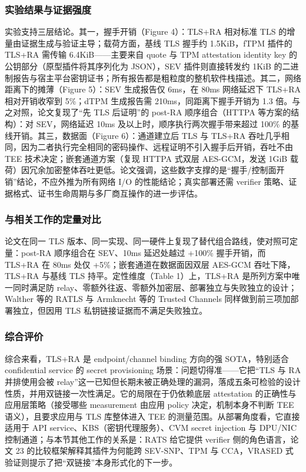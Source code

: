 \documentclass[11pt]{ctexart}
\begin{document}
\subsubsection{实验结果与证据强度}
实验支持三层结论。其一，握手开销（Figure 4）：TLS+RA 相对标准 TLS 的增量由证据生成与验证主导；载荷方面，基线 TLS 握手约 1.5KiB，fTPM 插件的 TLS+RA 需传输 6.4KiB——主要来自 quote 与 TPM attestation identity key 的公钥部分（原型插件将其序列化为 JSON），SEV 插件则直接转发约 1KiB 的二进制报告与宿主平台密钥证书；所有报告都是粗粒度的整机软件栈描述。其二，网络距离下的摊薄（Figure 5）：SEV 生成报告仅 6ms，在 80ms 网络延迟下 TLS+RA 相对开销收窄到 5\%；dTPM 生成报告需 210ms，同距离下握手开销为 1.3 倍。与之对照，论文复现了“先 TLS 后证明”的 post-RA 顺序组合（HTTPA 等方案的结构）：对 SEV，网络延迟 10ms 及以上时，顺序执行两次握手带来超过 100\% 的基线开销。其三，数据面（Figure 6）：通道建立后 TLS 与 TLS+RA 吞吐几乎相同，因为二者执行完全相同的密码操作、远程证明不引入握手后开销，吞吐不由 TEE 技术决定；嵌套通道方案（复现 HTTPA 式双层 AES-GCM，发送 1GiB 载荷）因冗余加密整体吞吐更低。论文强调，这些数字支撑的是“握手/控制面开销”结论，不应外推为所有网络 I/O 的性能结论；真实部署还需 verifier 策略、证据格式、证书生命周期与多厂商互操作的进一步评估。\par
\subsubsection{与相关工作的定量对比}
论文在同一 TLS 版本、同一实现、同一硬件上复现了替代组合路线，使对照可定量：post-RA 顺序组合在 SEV、10ms 延迟处越过 +100\% 握手开销，而 TLS+RA 在 80ms 处仅 +5\%；嵌套通道在数据面因双层 AES-GCM 吞吐下降，TLS+RA 与基线 TLS 持平。定性维度（Table 1）上，TLS+RA 是所列方案中唯一同时满足防 relay、零额外往返、零额外加密层、部署独立与失败独立的设计；Walther 等的 RATLS 与 Armknecht 等的 Trusted Channels 同样做到前三项加部署独立，但因用 TLS 私钥链接证据而不满足失败独立。\par
\subsubsection{综合评价}
综合来看，TLS+RA 是 endpoint/channel binding 方向的强 SOTA，特别适合 confidential service 的 secret provisioning 场景：问题切得准——它把“TLS 与 RA 并排使用会被 relay”这一已知但长期未被正确处理的漏洞，落成五条可检验的设计性质，并用双链接一次性满足。它的局限在于仍依赖底层 attestation 的正确性与应用层策略（接受哪些 measurement 由应用 policy 决定，机制本身不判断 TEE 语义），且要求应用与 TLS 库整体进入 TEE 的测量范围。从部署角度看，它直接适用于 API service、KBS（密钥代理服务）、CVM secret injection 与 DPU/NIC 控制通道；与本节其他工作的关系是：RATS 给它提供 verifier 侧的角色语言，论文 23 的比较框架解释其插件为何能跨 SEV-SNP、TPM 与 CCA，VRASED 式验证则提示了把“双链接”本身形式化的下一步。\par
\end{document}
